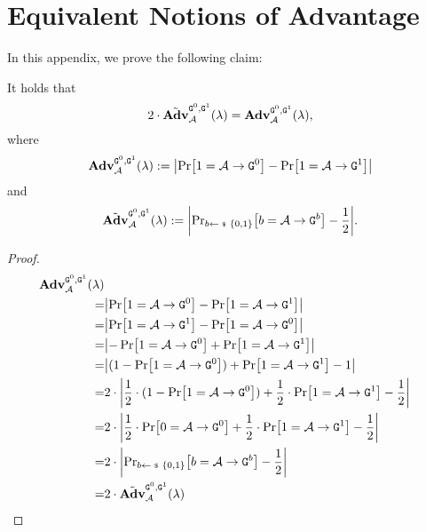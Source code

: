 \section{Equivalent Notions of Advantage}\label{app:calculus}
In this appendix, we prove the following claim:
\begin{claim}
It holds that
\begin{equation*}
2\cdot\tilde{\mathbf{Adv}}_{\mathcal{A}}^{\text{\texttt{G}}^0,\text{\texttt{G}}^1}(\lambda)=\mathbf{Adv}_{\mathcal{A}}^{\text{\texttt{G}}^0,\text{\texttt{G}}^1}(\lambda),
\end{equation*}
where
\[\mathbf{Adv}_\adv^{\M{G}^0,\M{G}^1}(\lambda):=\abs{\prob{1 = \adv \circ \M{G}^0} - \prob{1 = \adv \circ \M{G}^1}}\]
and
\[\tilde{\mathbf{Adv}}_\adv^{\M{G}^0,\M{G}^1}(\lambda):=\abs{\probsub{b\sample\bin}{b = \adv \circ \M{G}^b} - \frac{1}{2}}.\]
\end{claim}
\begin{proof}
\begin{align*}
\mathbf{Adv}_\adv^{\M{G}^0,\M{G}^1}(\lambda)\\
=&\abs{\prob{1 = \adv \circ \M{G}^0} - \prob{1 = \adv \circ \M{G}^1}}\\
=&\abs{\prob{1 = \adv \circ \M{G}^1}-\prob{1 = \adv \circ \M{G}^0}}\\
=&\abs{-\prob{1 = \adv \circ \M{G}^0} + \prob{1 = \adv \circ \M{G}^1}}\\
=&\abs{(1-\prob{1 = \adv \circ \M{G}^0}) + \prob{1 = \adv \circ \M{G}^1} - 1}\\
=&2\cdot\abs{\frac{1}{2}\cdot (1-\prob{1 = \adv \circ \M{G}^0}) + \frac{1}{2}\cdot \prob{1 = \adv \circ \M{G}^1} - \frac{1}{2}}\\
=&2\cdot\abs{\frac{1}{2}\cdot \prob{0 = \adv \circ \M{G}^0} + \frac{1}{2}\cdot \prob{1 = \adv \circ \M{G}^1} - \frac{1}{2}}\\
=&2\cdot\abs{\probsub{b\sample\bin}{b = \adv \circ \M{G}^b} - \frac{1}{2}}\\
=&2\cdot\tilde{\mathbf{Adv}}_\adv^{\M{G}^0,\M{G}^1}(\lambda)\\
\end{align*}
\end{proof}
